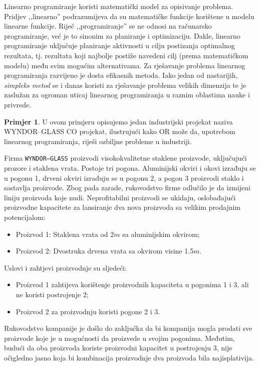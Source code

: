 \documentclass[a4paper, utf8, 11pt, colorlinks]{book}
\theoremstyle{definition}
\newtheorem{primjer}{Primjer}[chapter]
\begin{document}
Linearno programiranje koristi matematički model za opisivanje problema. Pridjev ,,linearno'' podrazumijeva da su  matematičke funkcije korištene u modelu linearne funkcije. Riječ ,,programiranje'' se ne odnosi na računarsko programiranje, već je to sinonim za planiranje i optimizaciju. Dakle, linearno programiranje uključuje planiranje aktivnosti u cilju postizanja optimalnog rezultata, tj. rezultata koji najbolje postiže navedeni cilj (prema matematičkom modelu) među svim mogućim alternativama.  Za rješavanje problema linearnog programiranja razvijeno je dosta efikasnih metoda. Iako jedan od nastarijih,  \emph{simpleks metod} se i danas koristi za rješavanje problema velikih dimenzija te je zaslužan za ogroman uticaj linearnog  programiranja u raznim oblastima nauke i privrede.

\begin{primjer}\label{primjer:graficki} U ovom primjeru opisujemo jedan industrijski projekat 
naziva {WYNDOR--GLASS CO projekat}, ilustrujući kako OR  može da, upotrebom linearnog programiranja, riješi ozbiljne probleme u industriji.
 \end{primjer}
Firma \texttt{WYNDOR--GLASS} proizvodi visokokvalitetne staklene proizvode, uključujući prozore i staklena vrata. Postoje tri pogona. Aluminijski okviri i okovi izrađuju se u pogonu 1, drveni okviri izrađuju se u pogonu 2, a pogon 3 proizvodi staklo i sastavlja proizvode.
Zbog pada zarade, rukovodstvo firme   odlučilo je da izmijeni liniju proizvoda koje nudi. Neprofitabilni proizvodi se ukidaju, oslobađajući proizvodne kapacitete za lansiranje dva nova proizvoda sa velikim prodajnim potencijalom:
\begin{itemize}
    \item Proizvod 1: Staklena vrata od 2$m$ sa aluminijskim okvirom;
    \item Proizvod 2: Dvostruka drvena vrata sa okvirom visine 1.5$m$.
\end{itemize}
Uslovi i zahtjevi proizvodnje su sljedeći:
\begin{itemize}
    \item Proizvod 1 zahtijeva   korištenje proizvodnih kapaciteta u pogonima 1 i 3, ali ne koristi postrojenje 2; 
    \item Proizvod 2 za proizvodnju koristi  pogone 2 i 3. 
\end{itemize}
    
    Rukovodstvo kompanije je došlo do zaključka da bi kompanija mogla prodati sve proizvode koje je u mogućnosti da proizvede u svojim pogonima. Međutim, budući da   oba proizvoda koriste proizvodni kapacitet u postrojenju 3, nije očigledno jasno koja bi kombinacija proizvodnje dva proizvoda bila najisplativija. %
\end{document}
